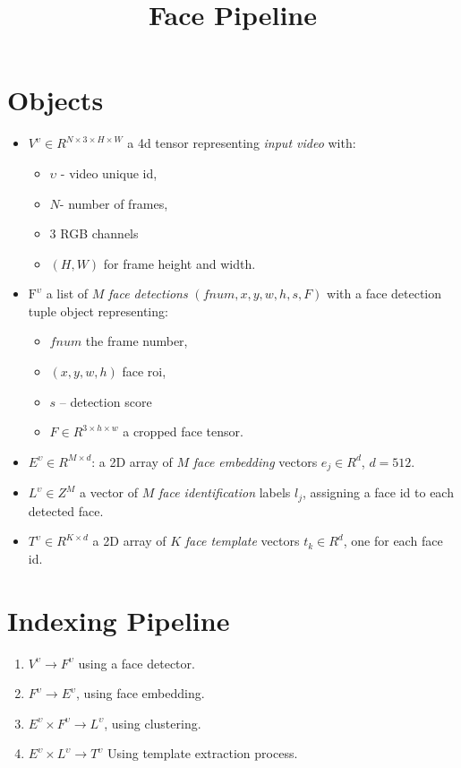 \documentclass{article}
\title{Face Pipeline}
\begin{document}

\section{Objects}
\begin{itemize}
    \item 
 $V^{\upsilon} \in {R}^{N\times 3 \times H \times W}$
    a 4d tensor representing {\it input video} with:
    \begin{itemize}
    \item 
    ${\upsilon}$ - video unique id,
    \item
    $N$- number of frames,
    \item
    $3$ RGB channels
    \item
    $(H,W)$ for frame height and width.
    \end{itemize}
    
    \item 
$\mbox{F}^{\upsilon}$ a list of $M$ {\it face detections} $(fnum,x,y,w,h,s,F)$
with a face detection tuple object representing:
\begin{itemize}
    \item $fnum$ the frame number, 
    \item $(x,y,w,h)$ face roi,
    \item $s$ -- detection score
    \item $F \in {R}^{3\times h \times w}$ a cropped face tensor. 
\end{itemize}

\item $E^{\upsilon} \in {R}^{M\times d}$: a 2D array of $M$ {\it face embedding} vectors $e_j \in {R}^d$, $d=512$. 
\item $L^{\upsilon} \in {Z}^{M}$ a vector of $M$ {\it face identification} labels $l_j$, assigning a face id to each detected face. 
\item $T^{\upsilon} \in {R}^{K\times d}$ a 2D array of $K$ {\it face template} vectors $t_k \in {R}^d$, one for each face id. 
\end{itemize}

\section{Indexing Pipeline}
\begin{enumerate}
    \item $V^{\upsilon} \rightarrow F^{\upsilon}$ using a face detector.
    \item $F^{\upsilon} \rightarrow E^{\upsilon}$, using face embedding. 
    \item $E^{\upsilon} \times F^{\upsilon} \rightarrow L^{\upsilon}$, using clustering. 
    \item $E^{\upsilon} \times L^{\upsilon} \rightarrow T^{\upsilon}$ Using template extraction process. 
\end{enumerate}
\end{document}
